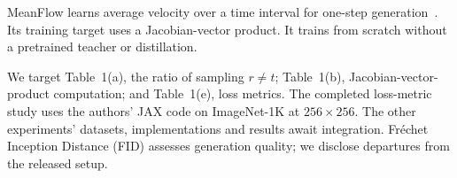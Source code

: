 MeanFlow learns average velocity over a time interval for one-step generation~\cite{meanflow}. Its training target uses a Jacobian-vector product. It trains from scratch without a pretrained teacher or distillation.

We target Table~1(a), the ratio of sampling $r\ne t$; Table~1(b), Jacobian-vector-product computation; and Table~1(e), loss metrics. The completed loss-metric study uses the authors' JAX code on ImageNet-1K at $256\times256$. The other experiments' datasets, implementations and results await integration. Fr\'echet Inception Distance (FID) assesses generation quality; we disclose departures from the released setup.
